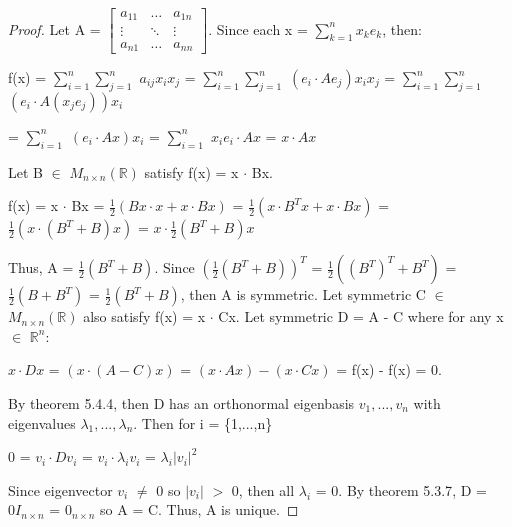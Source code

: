     \begin{proof}
        Let A =
        $\begin{bmatrix}
            a_{11} & \hdots & a_{1n} \\
            \vdots & \ddots & \vdots \\
            a_{n1} & \hdots & a_{nn}
        \end{bmatrix}$. Since each x = $\sum_{k=1}^n x_ke_k$, then:

        \hspace{0.5cm}
        f(x)
        = $\sum_{i=1}^n \sum_{j=1}^n$ $a_{ij}x_ix_j$
        = $\sum_{i=1}^n \sum_{j=1}^n$ $(e_i \cdot Ae_j)x_ix_j$
        = $\sum_{i=1}^n \sum_{j=1}^n$ $(e_i \cdot A(x_je_j))x_i$

        \hspace{1.3cm}
        = $\sum_{i=1}^n$ $(e_i \cdot Ax)x_i$
        = $\sum_{i=1}^n$ $x_ie_i \cdot Ax$
        = $x \cdot Ax$

        Let B $\in$ $M_{n \times n}(\mathbb{R})$ satisfy f(x) = x $\cdot$ Bx.

        \hspace{0.5cm}
        f(x)
        = x $\cdot$ Bx
        = $\frac{1}{2}(Bx \cdot x + x \cdot Bx)$
        = $\frac{1}{2}(x \cdot B^Tx + x \cdot Bx)$
        = $\frac{1}{2}(x \cdot (B^T + B)x)$
        = $x \cdot \frac{1}{2}(B^T + B)x$

        Thus, A = $\frac{1}{2}(B^T + B)$.
        Since $(\frac{1}{2}(B^T + B))^T$
        = $\frac{1}{2}((B^T)^T + B^T)$
        = $\frac{1}{2}(B + B^T)$
        = $\frac{1}{2}(B^T + B)$, then A is symmetric.
        Let symmetric C $\in$ $M_{n \times n}(\mathbb{R})$
        also satisfy f(x) = x $\cdot$ Cx.
        Let symmetric D = A - C where for any x $\in$ $\mathbb{R}^n$:

        \hspace{0.5cm}
        $x \cdot Dx$
        = $(x \cdot (A-C)x)$
        = $(x \cdot Ax) - (x \cdot Cx)$
        = f(x) - f(x)
        = 0.
        
        By {\color{red} theorem 5.4.4}, then D has an orthonormal eigenbasis
        $v_1,...,v_n$ with eigenvalues $\lambda_1,...,\lambda_n$.
        Then for i = \{1,...,n\}

        \hspace{0.5cm}
        0 = $v_i \cdot Dv_i$
        = $v_i \cdot \lambda_i v_i$
        = $\lambda_i |v_i|^2$

        Since eigenvector $v_i$ $\not =$ 0 so $|v_i|$ $>$ 0, then
        all $\lambda_i$ = 0. By {\color{red} theorem 5.3.7},
        D = $0 I_{n \times n}$ = $0_{n \times n}$ so A = C.
        Thus, A is unique.
    \end{proof}

